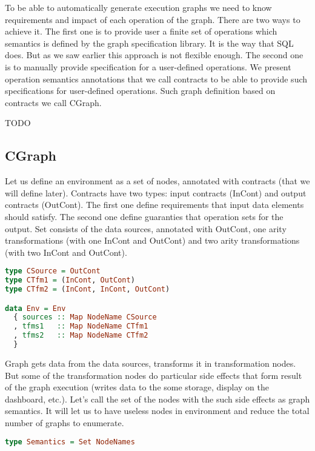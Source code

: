 To be able to automatically generate execution graphs we need to know requirements and impact of each operation of the graph.
There are two ways to achieve it.
The first one is to provide user a finite set of operations which semantics is defined by the graph specification library.
It is the way that SQL does.
But as we saw earlier this approach is not flexible enough.
The second one is to manually provide specification for a user-defined operations.
We present operation semantics annotations that we call contracts to be able to provide such specifications for user-defined operations.
Such graph definition based on contracts we call CGraph.

TODO

\subsection{CGraph}

Let us define an environment as a set of nodes, annotated with contracts (that we will define later).
Contracts have two types: input contracts (InCont) and output contracts (OutCont).
The first one define requirements that input data elements should satisfy.
The second one define guaranties that operation sets for the output.
Set consists of the data sources, annotated with OutCont, one arity transformations (with one InCont and OutCont) and two arity transformations (with two InCont and OutCont).

\begin{lstlisting}[language=Haskell]
type CSource = OutCont
type CTfm1 = (InCont, OutCont)
type CTfm2 = (InCont, InCont, OutCont)

data Env = Env
  { sources :: Map NodeName CSource
  , tfms1   :: Map NodeName CTfm1
  , tfms2   :: Map NodeName CTfm2
  }
\end{lstlisting}

Graph gets data from the data sources, transforms it in transformation nodes.
But some of the transformation nodes do particular side effects that form result of the graph execution (writes data to the some storage, display on the dashboard, etc.).
Let's call the set of the nodes with the such side effects as graph semantics.
It will let us to have useless nodes in environment and reduce the total number of graphs to enumerate.

\begin{lstlisting}[language=Haskell]
type Semantics = Set NodeNames
\end{lstlisting}

